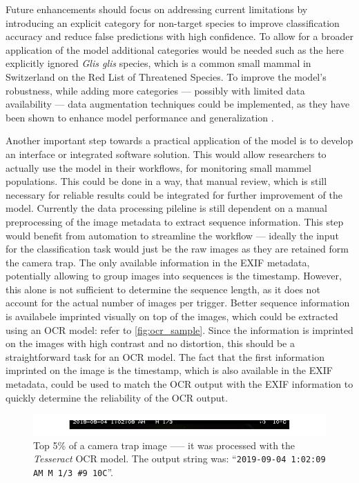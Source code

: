 Future enhancements should focus on addressing current limitations by introducing an explicit category for non-target species to improve classification accuracy and reduce false predictions with high confidence.
To allow for a broader application of the model additional categories would be needed such as the here explicitly ignored \textit{Glis glis} species, which is a common small mammal in Switzerland on the \textcite{iucnIUCNRedList2025} Red List of Threatened Species.
To improve the model's robustness, while adding more categories --- possibly with limited data availability --- data augmentation techniques could be implemented, as they have been shown to enhance model performance and generalization \autocite{shortenSurveyImageData2019}.

Another important step towards a practical application of the model is to develop an interface or integrated software solution.
This would allow researchers to actually use the model in their workflows, for monitoring small mammel populations.
This could be done in a way, that manual review, which is still necessary for reliable results could be integrated for further improvement of the model.
Currently the data processing pileline is still dependent on a manual preprocessing of the image metadata to extract sequence information.
This step would benefit from automation to streamline the workflow --- ideally the input for the classification task would just be the raw images as they are retained form the camera trap.
The only available information in the \ac{EXIF} metadata, potentially allowing to group images into sequences is the timestamp.
However, this alone is not sufficient to determine the sequence length, as it does not account for the actual number of images per trigger.
Better sequence information is availabele imprinted visually on top of the images, which could be extracted using an \ac{OCR} model: refer to \autoref{fig:ocr_sample}.
Since the information is imprinted on the images with high contrast and no distortion, this should be a straightforward task for an \ac{OCR} model.
The fact that the first information imprinted on the image is the timestamp, which is also available in the \ac{EXIF} metadata, could be used to match the \ac{OCR} output with the \ac{EXIF} information to quickly determine the reliability of the \ac{OCR} output.

\begin{figure}[ht]
\centering
\includegraphics{figures/ocr_example.pdf}
\caption{Top 5\% of a camera trap image —-- it was processed with the \textit{Tesseract} \ac{OCR} model. The output string was: \enquote{\texttt{2019-09-04 1:02:09 AM M 1/3 \#9 10\textdegree C}}.}
\label{fig:ocr_sample}
\end{figure}


